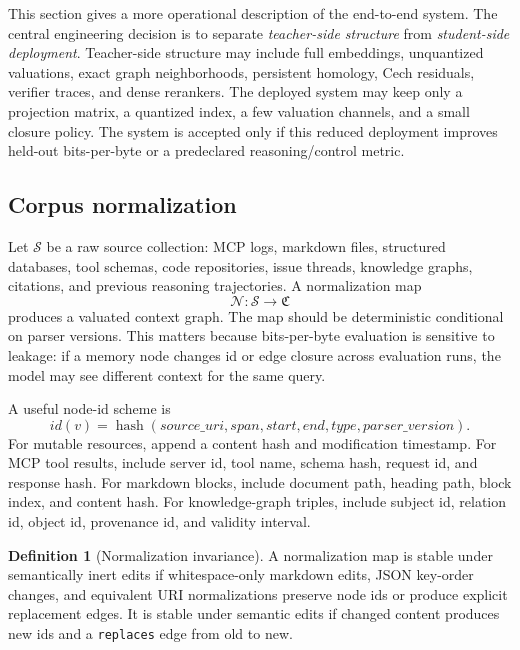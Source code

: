 \documentclass[11pt]{article}
\theoremstyle{definition}
\newtheorem{definition}[theorem]{Definition}
\theoremstyle{remark}
\begin{document}
This section gives a more operational description of the end-to-end system. The central engineering decision is to separate \emph{teacher-side structure} from \emph{student-side deployment}. Teacher-side structure may include full embeddings, unquantized valuations, exact graph neighborhoods, persistent homology, Cech residuals, verifier traces, and dense rerankers. The deployed system may keep only a projection matrix, a quantized index, a few valuation channels, and a small closure policy. The system is accepted only if this reduced deployment improves held-out bits-per-byte or a predeclared reasoning/control metric.

\subsection{Corpus normalization}

Let \(\mathcal S\) be a raw source collection: MCP logs, markdown files, structured databases, tool schemas, code repositories, issue threads, knowledge graphs, citations, and previous reasoning trajectories. A normalization map
\[
    \mathcal N:\mathcal S\longrightarrow \mathfrak C
\]
produces a valuated context graph. The map should be deterministic conditional on parser versions. This matters because bits-per-byte evaluation is sensitive to leakage: if a memory node changes id or edge closure across evaluation runs, the model may see different context for the same query.

A useful node-id scheme is
\[
    id(v)=\operatorname{hash}(source\_uri,span,start,end,type,parser\_version).
\]
For mutable resources, append a content hash and modification timestamp. For MCP tool results, include server id, tool name, schema hash, request id, and response hash. For markdown blocks, include document path, heading path, block index, and content hash. For knowledge-graph triples, include subject id, relation id, object id, provenance id, and validity interval.

\begin{definition}[Normalization invariance]
A normalization map is stable under semantically inert edits if whitespace-only markdown edits, JSON key-order changes, and equivalent URI normalizations preserve node ids or produce explicit replacement edges. It is stable under semantic edits if changed content produces new ids and a \texttt{replaces} edge from old to new.
\end{definition}
\end{document}
